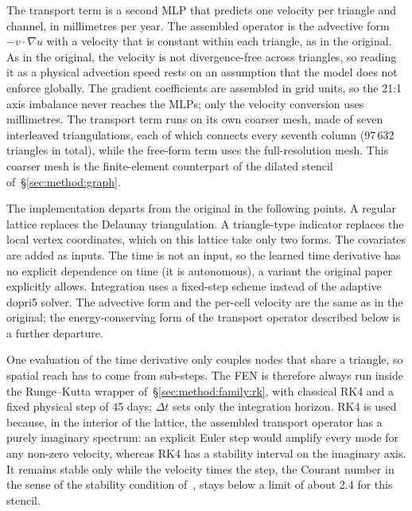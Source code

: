 The transport term is a second MLP that predicts one velocity per triangle
and channel, in millimetres per year. The assembled operator is the
advective form $-v \cdot \nabla u$ with a velocity that is constant within
each triangle, as in the original. As in the original, the velocity is not
divergence-free across triangles, so reading it as a physical advection
speed rests on an assumption that the model does not enforce globally. The gradient coefficients are assembled in grid
units, so the 21:1 axis imbalance never reaches the MLPs; only the velocity
conversion uses millimetres. The transport term runs on its own coarser mesh,
made of seven interleaved triangulations, each of which connects every
seventh column (97\,632 triangles in total), while the free-form term
uses the full-resolution mesh. This coarser mesh is the finite-element
counterpart of the dilated stencil of~\S\ref{sec:method:graph}.

The implementation departs from the original in the following points. A
regular lattice replaces the Delaunay triangulation. A triangle-type
indicator replaces the local vertex coordinates, which on this lattice take
only two forms. The covariates are added as inputs. The time is not an
input, so the learned time derivative has no explicit dependence on time
(it is autonomous), a variant the original paper explicitly allows. Integration uses a fixed-step scheme instead of the
adaptive dopri5 solver. The advective form and the per-cell velocity are the
same as in the original; the energy-conserving form of the transport
operator described below is a further departure.

One evaluation of the time derivative only couples nodes that share a
triangle, so spatial reach has to come from sub-steps. The FEN is therefore
always run inside the Runge--Kutta wrapper of~\S\ref{sec:method:family:rk},
with classical RK4 and a fixed physical step of 45 days; $\Delta t$ sets
only the integration horizon. RK4 is used because, in the interior of the
lattice, the assembled transport operator has a purely imaginary spectrum:
an explicit Euler step would amplify every mode for any non-zero velocity,
whereas RK4 has a stability interval on the imaginary axis. It remains
stable only while the velocity times the step, the Courant number in the
sense of the stability condition of~\citet{Courant1928}, stays below a limit
of about 2.4 for this stencil.

